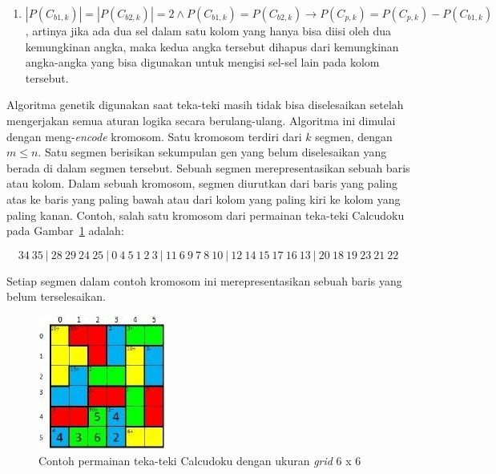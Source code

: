 \begin{enumerate}
\item \begin{math}|P(C_{b1,k})| = |P(C_{b2,k})| = 2 \land P(C_{b1,k}) = P(C_{b2,k}) \rightarrow P(C_{p,k}) = P(C_{p,k}) - P(C_{b1,k})\end{math}, artinya jika ada dua sel dalam satu kolom yang hanya bisa diisi oleh dua kemungkinan angka, maka kedua angka tersebut dihapus dari kemungkinan angka-angka yang bisa digunakan untuk mengisi sel-sel lain pada kolom tersebut.
\end{enumerate}

Algoritma genetik digunakan saat teka-teki masih tidak bisa diselesaikan setelah mengerjakan semua aturan logika secara berulang-ulang. Algoritma ini dimulai dengan meng-\textit{encode} kromosom. Satu kromosom terdiri dari \begin{math}k\end{math} segmen, dengan \begin{math}m \leq n\end{math}. Satu segmen berisikan sekumpulan gen yang belum diselesaikan yang berada di dalam segmen tersebut. Sebuah segmen merepresentasikan sebuah baris atau kolom. Dalam sebuah kromosom, segmen diurutkan dari baris yang paling atas ke baris yang paling bawah atau dari kolom yang paling kiri ke kolom yang paling kanan. Contoh, salah satu kromosom dari permainan teka-teki Calcudoku pada Gambar~\ref{fig:hybrid8} adalah:

\begin{displaymath}
34 \ 35 \ | \ 28 \ 29 \ 24 \ 25 \ | \ 0 \ 4 \ 5 \ 1 \ 2 \ 3 \ | \ 11 \ 6 \ 9 \ 7 \ 8 \ 10 \ | \ 12 \ 14 \ 15 \ 17 \ 16 \ 13 \ | \ 20 \ 18 \ 19 \ 23 \ 21 \ 22
\end{displaymath}

Setiap segmen dalam contoh kromosom ini merepresentasikan sebuah baris yang belum terselesaikan.

\begin{figure}
\centering
\captionsetup{justification=centering}
\includegraphics[scale=1]{Gambar/HybridGenetic8}
\caption[Contoh permainan teka-teki Calcudoku dengan ukuran \textit{grid} 6 x 6~\cite{johanna:12:hybrid}]{Contoh permainan teka-teki Calcudoku dengan ukuran \textit{grid} 6 x 6 ~\cite{johanna:12:hybrid}}
\label{fig:hybrid8}
\end{figure}

